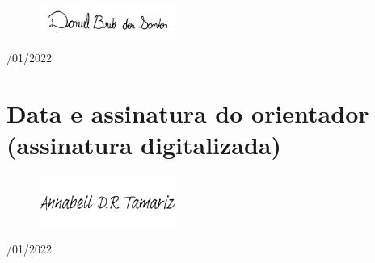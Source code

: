 \documentclass{article}
\begin{document}
\begin{figure}[H]
 \centering
 \includegraphics[width=0.4\textwidth]{Figures/Assinatura1.2.png}
\end{figure}
/01/2022

\section{Data e assinatura do orientador (assinatura digitalizada)}


\begin{figure}[H]
 \centering
 \includegraphics[width=0.4\textwidth]{Figures/assinatura_annabell.png}
\end{figure}
/01/2022



\end{document}
